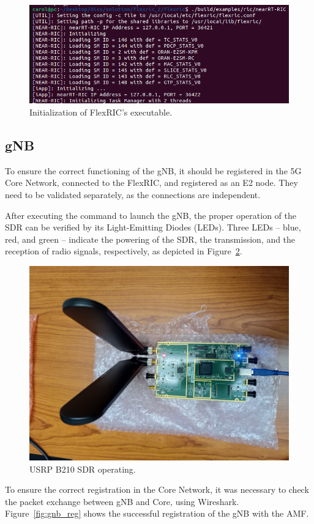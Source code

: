 \begin{figure}[H]
    \centering
    \includegraphics[width=0.5\linewidth]{figures/flexric_init}
    \caption{Initialization of FlexRIC's executable.}
    \label{fig:near-rt-ric}
\end{figure}

\subsection{gNB}\label{subsec:gnb}
To ensure the correct functioning of the gNB, it should be registered in the 5G Core Network, connected to the FlexRIC, and registered as an E2 node.
They need to be validated separately, as the connections are independent.

After executing the command to launch the gNB\@, the proper operation of the SDR can be verified by its Light-Emitting Diodes (LEDs).
Three LEDs  -- blue, red, and green -- indicate the powering of the SDR, the transmission, and the reception of radio signals, respectively, as depicted in Figure~\ref{fig:usrp_working}.

\begin{figure}[H]
    \centering
    \includegraphics[width=0.5\linewidth]{figures/usrp_working}
    \caption[USRP B210 SDR operating]{USRP B210 SDR operating.}
    \label{fig:usrp_working}
\end{figure}

To ensure the correct registration in the Core Network, it was necessary to check the packet exchange between gNB and Core, using Wireshark.
Figure~\ref{fig:gnb_reg} shows the successful registration of the gNB with the AMF\@.

